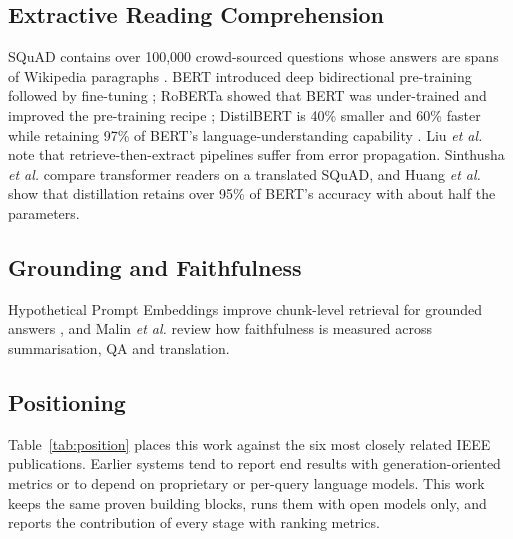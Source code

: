 \documentclass[conference]{IEEEtran}
\begin{document}
\subsection{Extractive Reading Comprehension}
SQuAD contains over 100,000 crowd-sourced questions whose answers are spans of Wikipedia
paragraphs \cite{rajpurkar2016}. BERT introduced deep bidirectional pre-training followed by
fine-tuning \cite{devlin2019}; RoBERTa showed that BERT was under-trained and improved the
pre-training recipe \cite{liu2019}; DistilBERT is 40\% smaller and 60\% faster while retaining
97\% of BERT's language-understanding capability \cite{sanh2019}. Liu \emph{et al.}
\cite{liu2023} note that retrieve-then-extract pipelines suffer from error propagation.
Sinthusha \emph{et al.} \cite{sinthusha2025} compare transformer readers on a translated SQuAD,
and Huang \emph{et al.} \cite{huang2023} show that distillation retains over 95\% of BERT's
accuracy with about half the parameters.

\subsection{Grounding and Faithfulness}
Hypothetical Prompt Embeddings improve chunk-level retrieval for grounded answers
\cite{vake2025}, and Malin \emph{et al.} \cite{malin2025} review how faithfulness is measured
across summarisation, QA and translation.

\subsection{Positioning}
Table~\ref{tab:position} places this work against the six most closely related IEEE
publications. Earlier systems tend to report end results with generation-oriented metrics or to
depend on proprietary or per-query language models. This work keeps the same proven building
blocks, runs them with open models only, and reports the contribution of every stage with
ranking metrics.
\end{document}
